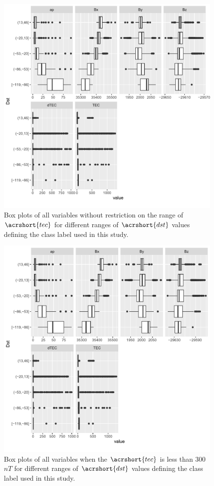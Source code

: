 \documentclass[sn-mathphys-num]{sn-jnl}%
\begin{document}
\begin{figure}
    \centering
    \includegraphics[width=0.9\linewidth]{dataset2boxplot_fix.pdf}
    \caption{Box plots of all variables without restriction on the range of $\acrshort{tec}$ for different ranges of $\acrshort{dst}$ values defining the class label used in this study.}
    \label{fig:dataset2boxplot}
\end{figure}

\begin{figure}
    \centering
    \includegraphics[width=0.9\linewidth]{iono3boxplot_fix.pdf}
    \caption{Box plots of all variables when the $\acrshort{tec}$ is less than $300$ $nT$ for different ranges of $\acrshort{dst}$ values defining the class label used in this study.}
    \label{fig:iono3boxplot}
\end{figure}
\end{document}
